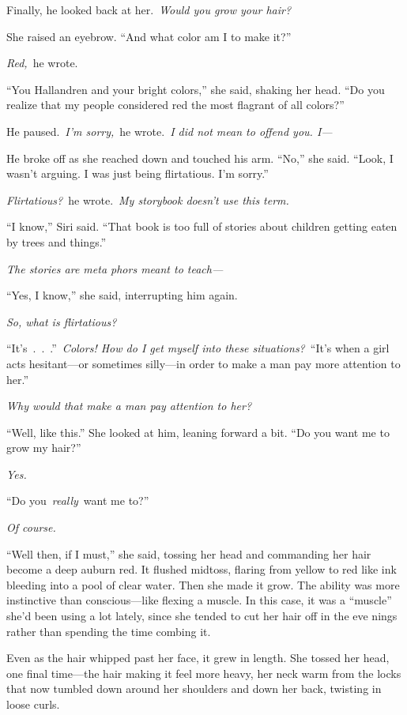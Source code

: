 Finally, he looked back at her.~\textit{Would you grow your hair?}

She raised an eyebrow. “And what color am I to make it?”

\textit{Red,}~he wrote.

“You Hallandren and your bright colors,” she said, shaking her head. “Do you realize that my people considered red the most flagrant of all colors?”

He paused.~\textit{I’m sorry,}~he wrote.~\textit{I did not mean to offend you. I—}

He broke off as she reached down and touched his arm. “No,” she said. “Look, I wasn’t arguing. I was just being flirtatious. I’m sorry.”

\textit{Flirtatious?}~he wrote.~\textit{My storybook doesn’t use this term.}

“I know,” Siri said. “That book is too full of stories about children getting eaten by trees and things.”

\textit{The stories are meta phors meant to teach—}

“Yes, I know,” she said, interrupting him again.

\textit{So, what is flirtatious?}

“It’s~.~.~.”~\textit{Colors! How do I get myself into these situations?}~“It’s when a girl acts hesitant—or sometimes silly—in order to make a man pay more attention to her.”

\textit{Why would that make a man pay attention to her?}

“Well, like this.” She looked at him, leaning forward a bit. “Do you want me to grow my hair?”

\textit{Yes.}

“Do you~\textit{really}~want me to?”

\textit{Of course.}

“Well then, if I must,” she said, tossing her head and commanding her hair become a deep auburn red. It flushed midtoss, flaring from yellow to red like ink bleeding into a pool of clear water. Then she made it grow. The ability was more instinctive than conscious—like flexing a muscle. In this case, it was a “muscle” she’d been using a lot lately, since she tended to cut her hair off in the eve nings rather than spending the time combing it.

Even as the hair whipped past her face, it grew in length. She tossed her head, one final time—the hair making it feel more heavy, her neck warm from the locks that now tumbled down around her shoulders and down her back, twisting in loose curls.

